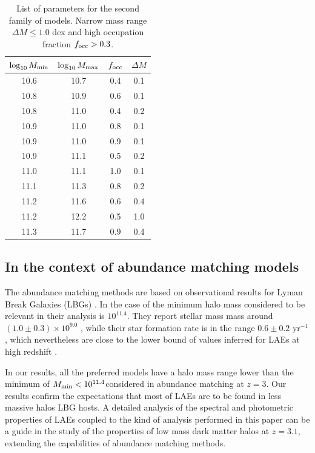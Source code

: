 \documentclass[usenatbib]{mn2e}
\newcommand{\hMsun}{{\ifmmode{h^{-1}{\rm
        {M_{\odot}}}}\else{$h^{-1}{\rm{M_{\odot}}}$}\fi}}
\newcommand{\Msun}{{\ifmmode{{\rm {M_{\odot}}}}\else{${\rm{M_{\odot}}}$}\fi}}
\begin{document}
{\begin{table}
\begin{center}
\begin{tabular}{cccc}\hline\hline
$\log_{10}M_{\rm min}$ & $\log_{10}M_{\rm max}$ & $f_{\rm occ}$ & $\Delta M$\\\hline
10.6 &10.7 &0.4 & 0.1\\
10.8 &10.9 &0.6 & 0.1\\
10.8 &11.0 &0.4 & 0.2\\
10.9 &11.0 &0.8 & 0.1\\
10.9 &11.0 &0.9 & 0.1\\
10.9 &11.1 &0.5 & 0.2\\
11.0 &11.1 &1.0 & 0.1\\
11.1 &11.3 &0.8 & 0.2\\
11.2 &11.6 &0.6 & 0.4\\
11.2 &12.2 &0.5 & 1.0\\
11.3 &11.7 &0.9 & 0.4\\\hline
\end{tabular}
\end{center}
\caption{\label{table:secondfamily}List of parameters for the second
  family of models. Narrow mass range $\Delta M\leq 1.0$ dex and high occupation fraction $f_{\rm occ}>0.3$.}
\end{table}

\subsection{In the context of abundance matching models}

The abundance matching methods are based on observational results for
Lyman Break Galaxies (LBGs) \citep{Behroozi2013a,Behroozi2013b}.  In
the case of \cite{Behroozi2013a} the minimum halo mass considered to
be relevant in their analysis is $10^{11.4}$\hMsun. They report
stellar mass mass around $(1.0\pm0.3)\times 10^{9.0}$ \hMsun, while
their star formation rate is in the range $0.6\pm 0.2$ \Msun yr$^{-1}$,
which nevertheless are close to the lower bound of values inferred for
LAEs at high redshift \citep{Gawiser2007,Nilsson2009,Pentericci2009}. 

In our results, all the preferred models have a halo mass range lower
than the minimum of $M_{\rm min}<10^{11.4}$\hMsun considered in
abundance matching at $z=3$. Our results confirm the expectations
that most of  LAEs are to be found in less massive halos LBG hosts. A
detailed analysis of the spectral and photometric properties of LAEs
coupled to the kind of analysis performed in this paper can be a guide
in the study of the properties of low mass dark matter halos at
$z=3.1$, extending the capabilities of abundance matching methods.

}
\end{document}
